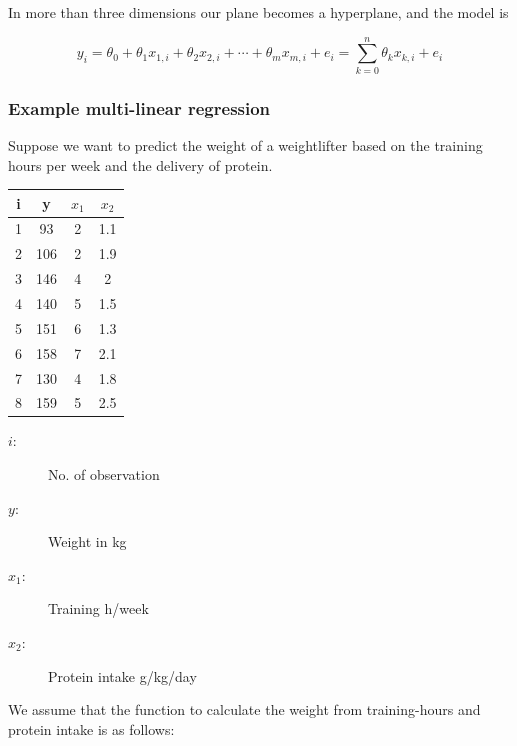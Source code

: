 \documentclass[11pt]{article}
\renewcommand*{\thead}[1]{\bfseries #1}
\begin{document}
\noindent
In more than three dimensions our plane becomes a hyperplane, and the model is

\begin{equation*}
    y_i = \theta_0 + \theta_1 x_{1,i} + \theta_2 x_{2,i} + \cdots + \theta_m x_{m,i}  + e_i=\sum_{k=0}^{n}\theta_k x_{k,i} + e_i
\end{equation*}

\subsubsection{Example multi-linear regression}

Suppose we want to predict the weight of a weightlifter based on the training hours per week and the delivery of protein.

\vspace{10px}

\begin{minipage}{0.25\textwidth}
    \begin{tabular}{cccc}
        \toprule
        \thead{i} & \thead{y} & \thead{$x_1$} & \thead{$x_2$} \\
        \hline
        1         & 93        & 2             & 1.1           \\
        \hline
        2         & 106       & 2             & 1.9           \\
        \hline
        3         & 146       & 4             & 2             \\
        \hline
        4         & 140       & 5             & 1.5           \\
        \hline
        5         & 151       & 6             & 1.3           \\
        \hline
        6         & 158       & 7             & 2.1           \\
        \hline
        7         & 130       & 4             & 1.8           \\
        \hline
        8         & 159       & 5             & 2.5           \\
        \bottomrule
    \end{tabular}
\end{minipage}\hfill
\begin{minipage}{0.75\textwidth}
    \begin{description}
        \item[$i$: ] No. of observation
        \item[$y$: ] Weight in kg
        \item[$x_1$: ] Training h/week
        \item[$x_2$: ] Protein intake g/kg/day
    \end{description}

\noindent
We assume that the function to calculate the weight from training-hours and protein intake is as follows:
\end{minipage}
\end{document}
